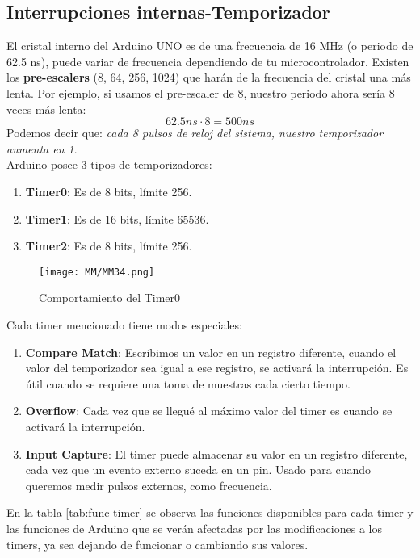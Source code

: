 \documentclass[
	12pt, %
	fleqn, %
	a4paper, %
	oneside, %
]{LegrandOrangeBook}
\begin{document}
\subsection{Interrupciones internas-Temporizador}
El cristal interno del Arduino UNO es de una frecuencia de 16 MHz (o periodo de 62.5 ns), puede variar de frecuencia dependiendo de tu microcontrolador. Existen los \textbf{pre-escalers} (8, 64, 256, 1024) que harán de la frecuencia del cristal una más lenta. Por ejemplo, si usamos el pre-escaler de 8, nuestro periodo ahora sería 8 veces más lenta:
\begin{displaymath}
62.5 ns\cdot 8=500ns
\end{displaymath}
Podemos decir que: \emph{cada 8 pulsos de reloj del sistema, nuestro temporizador aumenta en 1}.\\
Arduino posee 3 tipos de temporizadores:
\begin{enumerate}
\item \textbf{Timer0}: Es de 8 bits, límite 256.
\item \textbf{Timer1}: Es de 16 bits, límite 65536.
\item \textbf{Timer2}: Es de 8 bits, límite 256.
\end{enumerate}
\begin{figure}[H]
\centering
\texttt{[image: MM/MM34.png]}
\caption{Comportamiento del Timer0}
\end{figure}
Cada timer mencionado tiene modos especiales:
\begin{enumerate}
\item \textbf{Compare Match}: Escribimos un valor en un registro diferente, cuando el valor del temporizador sea igual a ese registro, se activará la interrupción. Es útil cuando se requiere una toma de muestras cada cierto tiempo.
\item \textbf{Overflow}: Cada vez que se llegué al máximo valor del timer es cuando se activará la interrupción.
\item \textbf{Input Capture}: El timer puede almacenar su valor en un registro diferente, cada vez que un evento externo suceda en un pin. Usado para cuando queremos medir pulsos externos, como frecuencia.
\end{enumerate}
En la tabla \ref{tab:func timer} se observa las funciones disponibles para cada timer y las funciones de Arduino que se verán afectadas por las modificaciones a los timers, ya sea dejando de funcionar o cambiando sus valores.
\end{document}
